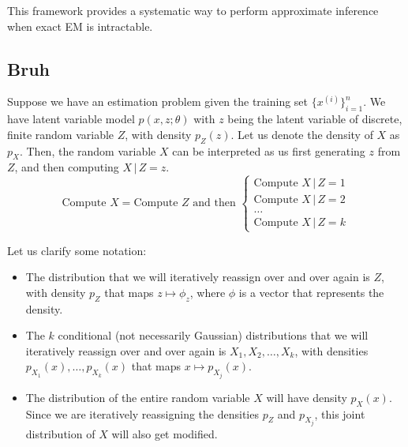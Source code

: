   This framework provides a systematic way to perform approximate inference when exact EM is intractable.

\subsection{Bruh}

  Suppose we have an estimation problem given the training set $\{x^{(i)}\}_{i=1}^n$. We have latent variable model $p(x, z; \theta)$ with $z$ being the latent variable of discrete, finite random variable $Z$, with density $p_Z (z)$. Let us denote the density of $X$ as $p_X$. Then, the random variable $X$ can be interpreted as us first generating $z$ from $Z$, and then computing $X\,|\,Z = z$.  
  \[\text{Compute } X = \text{Compute } Z \text{ and then } \begin{cases} 
  \text{Compute } X \,|\, Z = 1 \\
  \text{Compute } X \,|\, Z = 2 \\
  \ldots \\
  \text{Compute } X \,|\, Z = k
  \end{cases}\]

  Let us clarify some notation: 
  \begin{itemize}
    \item The distribution that we will iteratively reassign over and over again is $Z$, with density $p_Z$ that maps $z \mapsto \phi_z$, where $\phi$ is a vector that represents the density.
    \item The $k$ conditional (not necessarily Gaussian) distributions that we will iteratively reassign over and over again is $X_1, X_2, \ldots, X_k$, with densities $p_{X_1} (x), \ldots, p_{X_k} (x)$ that maps $x \mapsto p_{X_j} (x)$.
    \item The distribution of the entire random variable $X$ will have density $p_X (x)$. Since we are iteratively reassigning the densities $p_Z$ and $p_{X_j}$, this joint distribution of $X$ will also get modified.
  \end{itemize}

